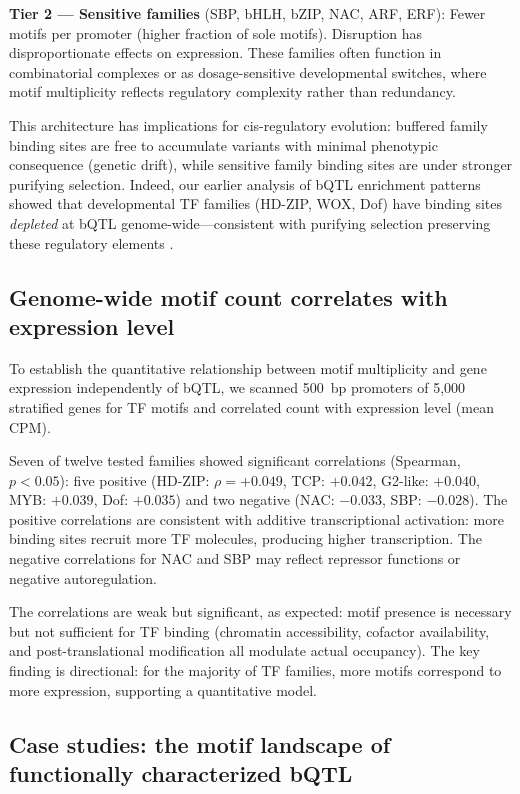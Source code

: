 \documentclass[11pt,a4paper]{article}
\begin{document}
\textbf{Tier 2 --- Sensitive families} (SBP, bHLH, bZIP, NAC, ARF, ERF): Fewer motifs per promoter (higher fraction of sole motifs). Disruption has disproportionate effects on expression. These families often function in combinatorial complexes or as dosage-sensitive developmental switches, where motif multiplicity reflects regulatory complexity rather than redundancy.

This architecture has implications for cis-regulatory evolution: buffered family binding sites are free to accumulate variants with minimal phenotypic consequence (genetic drift), while sensitive family binding sites are under stronger purifying selection. Indeed, our earlier analysis of bQTL enrichment patterns showed that developmental TF families (HD-ZIP, WOX, Dof) have binding sites \textit{depleted} at bQTL genome-wide---consistent with purifying selection preserving these regulatory elements \citep{engelhorn2025}.

\subsection{Genome-wide motif count correlates with expression level}

To establish the quantitative relationship between motif multiplicity and gene expression independently of bQTL, we scanned 500~bp promoters of 5,000 stratified genes for TF motifs and correlated count with expression level (mean CPM).

Seven of twelve tested families showed significant correlations (Spearman, $p < 0.05$): five positive (HD-ZIP: $\rho = +0.049$, TCP: $+0.042$, G2-like: $+0.040$, MYB: $+0.039$, Dof: $+0.035$) and two negative (NAC: $-0.033$, SBP: $-0.028$). The positive correlations are consistent with additive transcriptional activation: more binding sites recruit more TF molecules, producing higher transcription. The negative correlations for NAC and SBP may reflect repressor functions or negative autoregulation.

The correlations are weak but significant, as expected: motif presence is necessary but not sufficient for TF binding (chromatin accessibility, cofactor availability, and post-translational modification all modulate actual occupancy). The key finding is directional: for the majority of TF families, more motifs correspond to more expression, supporting a quantitative model.

\subsection{Case studies: the motif landscape of functionally characterized bQTL}
\end{document}
